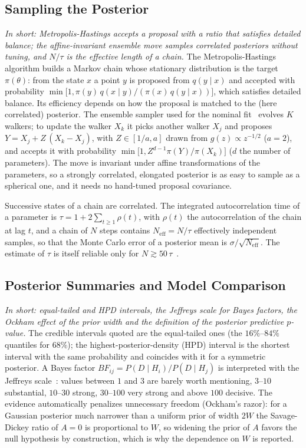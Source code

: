 \subsection{Sampling the Posterior}
\label{app:theory}
\emph{In short: Metropolis-Hastings accepts a proposal with a ratio that satisfies detailed balance; the affine-invariant ensemble move samples correlated posteriors without tuning, and $N/\tau$ is the effective length of a chain.}
The Metropolis-Hastings algorithm builds a Markov chain whose stationary distribution is the target $\pi(\theta)$: from the state $x$ a point $y$ is proposed from $q(y\mid x)$ and accepted with probability $\min\!\big[1,\pi(y)\,q(x\mid y)/(\pi(x)\,q(y\mid x))\big]$, which satisfies detailed balance. Its efficiency depends on how the proposal is matched to the (here correlated) posterior. The ensemble sampler used for the nominal fit~\cite{goodman_weare,emcee} evolves $K$ walkers; to update the walker $X_k$ it picks another walker $X_j$ and proposes $Y=X_j+Z\,(X_k-X_j)$, with $Z\in[1/a,a]$ drawn from $g(z)\propto z^{-1/2}$ ($a=2$), and accepts it with probability $\min\!\big[1,Z^{d-1}\pi(Y)/\pi(X_k)\big]$ ($d$ the number of parameters). The move is invariant under affine transformations of the parameters, so a strongly correlated, elongated posterior is as easy to sample as a spherical one, and it needs no hand-tuned proposal covariance.

Successive states of a chain are correlated. The integrated autocorrelation time of a parameter is $\tau=1+2\sum_{t\geq1}\rho(t)$, with $\rho(t)$ the autocorrelation of the chain at lag $t$, and a chain of $N$ steps contains $N_{\mathrm{eff}}=N/\tau$ effectively independent samples, so that the Monte Carlo error of a posterior mean is $\sigma/\sqrt{N_{\mathrm{eff}}}$. The estimate of $\tau$ is itself reliable only for $N\gtrsim50\,\tau$~\cite{emcee}.

\subsection{Posterior Summaries and Model Comparison}
\emph{In short: equal-tailed and HPD intervals, the Jeffreys scale for Bayes factors, the Ockham effect of the prior width and the definition of the posterior predictive $p$-value.}
The credible intervals quoted are the equal-tailed ones (the $16\%$--$84\%$ quantiles for $68\%$); the highest-posterior-density (HPD) interval is the shortest interval with the same probability and coincides with it for a symmetric posterior. A Bayes factor $BF_{ij}=P(D\mid H_i)/P(D\mid H_j)$ is interpreted with the Jeffreys scale~\cite{jeffreys,kass_raftery}: values between $1$ and $3$ are barely worth mentioning, $3$--$10$ substantial, $10$--$30$ strong, $30$--$100$ very strong and above $100$ decisive. The evidence automatically penalizes unnecessary freedom (Ockham's razor): for a Gaussian posterior much narrower than a uniform prior of width $2W$ the Savage-Dickey ratio of $A=0$ is proportional to $W$, so widening the prior of $A$ favors the null hypothesis by construction, which is why the dependence on $W$ is reported.

